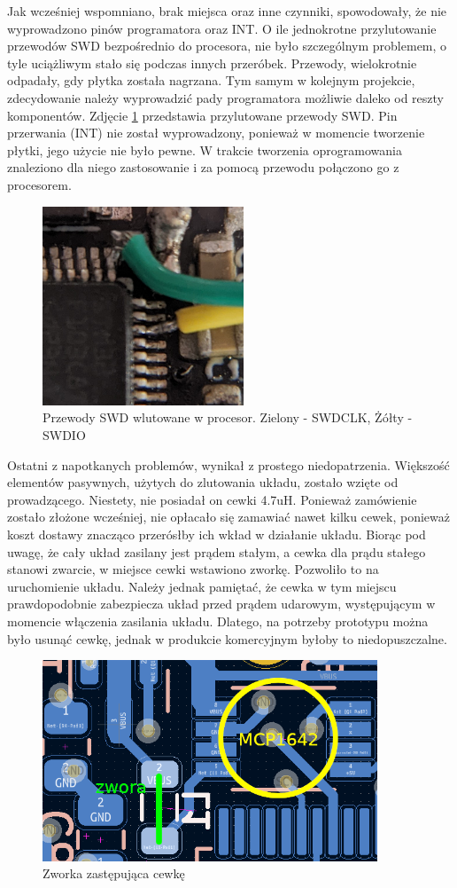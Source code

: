 Jak wcześniej wspomniano, brak miejsca oraz inne czynniki, spowodowały, że nie wyprowadzono pinów programatora oraz INT. O ile jednokrotne przylutowanie przewodów SWD bezpośrednio do procesora, nie było szczególnym problemem, o tyle uciążliwym stało się podczas innych przeróbek. Przewody, wielokrotnie odpadały, gdy płytka została nagrzana. Tym samym w kolejnym projekcie, zdecydowanie należy wyprowadzić pady programatora możliwie daleko od reszty komponentów. Zdjęcie \ref{img:fix_swd} przedstawia przylutowane przewody SWD. Pin przerwania (INT) nie został wyprowadzony, ponieważ w momencie tworzenie płytki, jego użycie nie było pewne. W trakcie tworzenia oprogramowania znaleziono dla niego zastosowanie i za pomocą przewodu połączono go z procesorem.

\begin{figure}[H]
    \centering
    \includegraphics[width=6cm]{Graphics/fix_swd.png}
    \caption{Przewody SWD wlutowane w procesor. Zielony - SWDCLK, Żółty - SWDIO}
    \label{img:fix_swd}
\end{figure}
Ostatni z napotkanych problemów, wynikał z prostego niedopatrzenia. Większość elementów pasywnych, użytych do zlutowania układu, zostało wzięte od prowadzącego. Niestety, nie posiadał on cewki 4.7uH. Ponieważ zamówienie zostało złożone wcześniej, nie opłacało się zamawiać nawet kilku cewek, ponieważ koszt dostawy znacząco przerósłby ich wkład w działanie układu. Biorąc pod uwagę, że cały układ zasilany jest prądem stałym, a cewka dla prądu stałego stanowi zwarcie, w miejsce cewki wstawiono zworkę. Pozwoliło to na uruchomienie układu. Należy jednak pamiętać, że cewka w tym miejscu prawdopodobnie zabezpiecza układ przed prądem udarowym, występującym w momencie włączenia zasilania układu. Dlatego, na potrzeby prototypu można było usunąć cewkę, jednak w produkcie komercyjnym byłoby to niedopuszczalne.
\begin{figure}[H]
    \centering
    \includegraphics[width=10cm]{Graphics/fix_inductor.png}
    \caption{Zworka zastępująca cewkę}
    \label{img:fix_inductor}
\end{figure}

